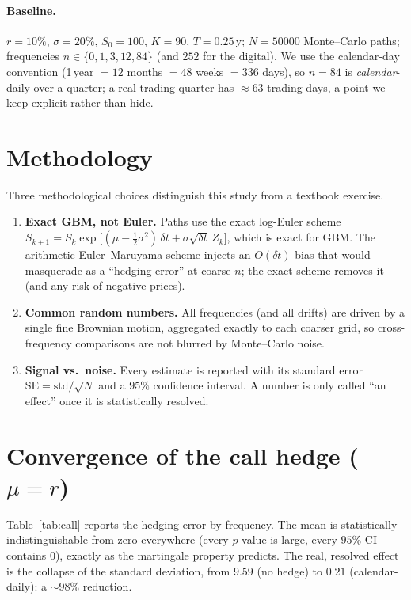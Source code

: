 \documentclass[11pt]{article}
\begin{document}
\paragraph{Baseline.}
$r=10\%$, $\sigma=20\%$, $S_0=100$, $K=90$, $T=0.25$\,y;
$N=\num{50000}$ Monte--Carlo paths; frequencies
$n\in\{0,1,3,12,84\}$ (and $252$ for the digital). We use the calendar-day
convention (1\,year $=12$ months $=48$ weeks $=336$ days), so $n=84$ is
\emph{calendar}-daily over a quarter; a real trading quarter has $\approx 63$
trading days, a point we keep explicit rather than hide.

\section{Methodology}

Three methodological choices distinguish this study from a textbook exercise.

\begin{enumerate}
\item \textbf{Exact GBM, not Euler.} Paths use the exact log-Euler scheme
$S_{k+1}=S_k\exp\!\big[(\mu-\tfrac12\sigma^2)\,\delta t + \sigma\sqrt{\delta t}\,Z_k\big]$,
which is exact for GBM. The arithmetic Euler--Maruyama scheme injects an
$O(\delta t)$ bias that would masquerade as a ``hedging error'' at coarse $n$;
the exact scheme removes it (and any risk of negative prices).
\item \textbf{Common random numbers.} All frequencies (and all drifts) are driven
by a single fine Brownian motion, aggregated exactly to each coarser grid, so
cross-frequency comparisons are not blurred by Monte--Carlo noise.
\item \textbf{Signal vs.\ noise.} Every estimate is reported with its standard
error $\mathrm{SE}=\mathrm{std}/\sqrt{N}$ and a $95\%$ confidence interval. A
number is only called ``an effect'' once it is statistically resolved.
\end{enumerate}

\section{Convergence of the call hedge ($\mu=r$)}

Table~\ref{tab:call} reports the hedging error by frequency. The mean is
statistically indistinguishable from zero everywhere (every $p$-value is large,
every $95\%$ CI contains $0$), exactly as the martingale property predicts. The
real, resolved effect is the collapse of the standard deviation, from
$9.59$ (no hedge) to $0.21$ (calendar-daily): a $\sim 98\%$ reduction.
\end{document}
